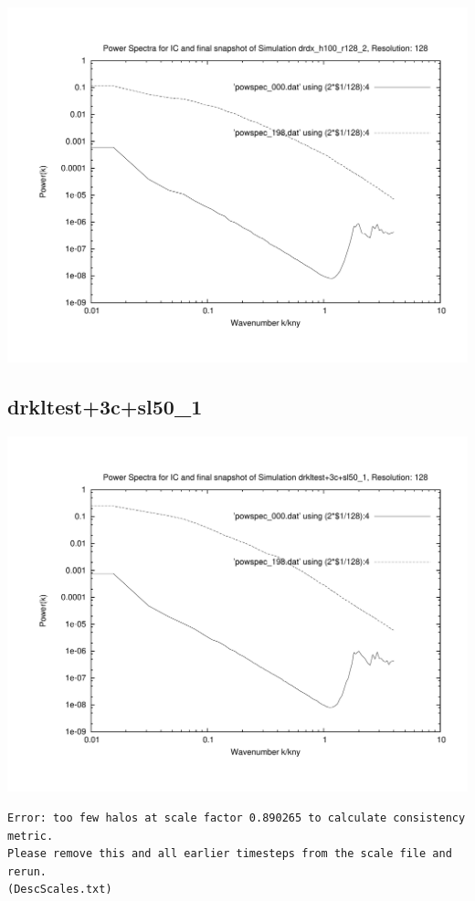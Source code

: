\includegraphics[scale=0.5]{r128/h100/drdx_h100_r128_2/plot_powspec_drdx_h100_r128_2.pdf}




\newpage
\subsection{drkltest+3c+sl50\_1}
\includegraphics[scale=0.5]{r128/h100/drkltest+3c+sl50_1/plot_powspec_drkltest+3c+sl50_1.pdf}


\begin{verbatim}
Error: too few halos at scale factor 0.890265 to calculate consistency metric.
Please remove this and all earlier timesteps from the scale file and rerun.
(DescScales.txt)
\end{verbatim}

